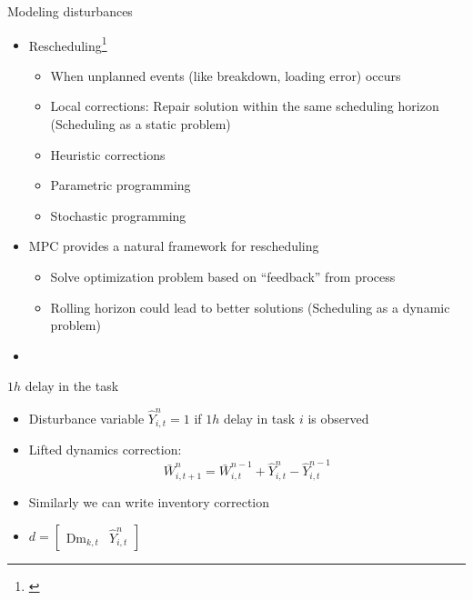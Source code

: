 \documentclass[table]{beamer}
\newcommand{\Dem}{\textrm{Dm}}
\begin{document}
\begin{frame}{Modeling disturbances}
\begin{itemize} 
\item \alert{Rescheduling}\footnote{\citet{li:ierapetritou:2008b}}
 \begin{itemize}
   \item When unplanned events (like breakdown, loading error) occurs
   \item Local corrections: Repair solution within the same
     scheduling horizon (\alert{Scheduling as a static problem})
   \item Heuristic corrections
   \item Parametric programming
   \item Stochastic programming
 \end{itemize}
\item MPC provides a natural framework for rescheduling
  \begin{itemize}
    \item Solve optimization problem based on ``feedback'' from
      process
   \item Rolling horizon could lead to better solutions
     (\alert{Scheduling as a dynamic problem})
  \end{itemize}
\item {\color{blue}{Model events that can lead to rescheduling as disturbances}}
\end{itemize}
\end{frame}

\begin{frame}{$1h$ delay in the task}
\begin{figure}
\centering
 \resizebox{0.65\textwidth}{!}{}
\end{figure}
\begin{itemize}
\item Disturbance variable $\hat{Y}_{i,t}^n = 1$ if $1h$ delay in task
  $i$ is observed

\item \alert{Lifted dynamics correction}:
  \[ \bar{W}_{i,t+1}^{n} = \bar{W}_{i,t}^{n-1} + \hat{Y}_{i,t}^{n} -
\hat{Y}_{i,t}^{n-1}\]
\item Similarly we can write \alert{inventory correction}
\item $d = \begin{bmatrix} \Dem_{k,t} & \hat{Y}_{i,t}^n \end{bmatrix}$
\end{itemize}
\end{frame}
\end{document}
